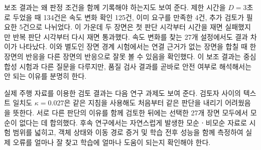 보조 결과는 왜 판정 조건을 함께 기록해야 하는지도 보여 준다. 제한 시간을 $D=3$초로 두었을 때 134건은 속도 변화 확인 125건, 이미 요구를 만족한 4건, 추가 검토가 필요한 5건으로 나뉘었다. 이 가운데 두 장면은 첫 판단 시각부터 시간을 재면 실패했지만 반복 판단 시각부터 다시 재면 통과했다. 속도 변화를 찾는 27개 설정에서도 결과 차이가 나타났다. 이와 별도인 장면 경계 시험에서는 연결 근거가 없는 장면을 합칠 때 한 장면의 반응을 다른 장면의 반응으로 잘못 볼 수 있음을 확인했다. 이 보조 결과는 중심 합성 시험과 다른 질문을 다루지만, 품질 검사 결과를 곧바로 안전 여부로 해석해서는 안 되는 이유를 분명히 한다.

실제 주행 자료를 이용한 검토 결과는 다음 연구 과제도 보여 준다. 검토자 사이의 텍스트 일치도 $\kappa=0.027$은 같은 지침을 사용해도 처음부터 같은 판단을 내리기 어려웠음을 뜻한다. 서로 다른 판단의 이유를 함께 검토한 뒤에는 선택한 27개 장면 모두에서 모순이 없다는 데 합의했다. 후속 연구에서는 자연스럽게 발생한 모순ㆍ비모순 자료로 시험 범위를 넓히고, 객체 상태와 이동 경로 증거 및 학습 전후 성능을 함께 측정하여 실제 오류를 얼마나 잘 찾고 학습에 얼마나 도움이 되는지 확인해야 한다.
